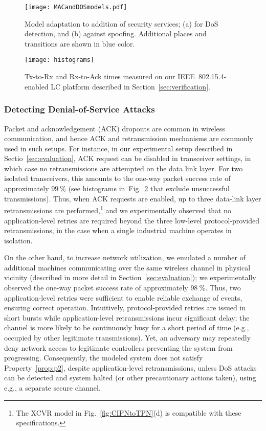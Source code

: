 \begin{figure}[!t]
	\centering
	\texttt{[image: MACandDOSmodels.pdf]}
	\caption{Model adaptation to addition of security services; (a) for DoS detection, and (b) against spoofing. Additional places and transitions are shown in blue color.}
	\label{fig:MACandDOSmodels}
\end{figure}
%
\begin{figure}[!t]
	\centering
	\texttt{[image: histograms]}
	\caption{Tx-to-Rx and Rx-to-Ack times measured on our IEEE~802.15.4-enabled LC platform described in Section~\ref{sec:verification}.}
	\label{fig:histograms}
\end{figure}
%


\subsubsection{Detecting Denial-of-Service Attacks}
\label{subsubsec:DoSdetection}
Packet and acknowledgement (ACK) dropouts are common in wireless communication, and hence ACK and retransmission mechanisms are commonly used in such setups. For instance, in our experimental setup described in Sectio~\ref{sec:evaluation}, ACK request can be disabled in transceiver settings, in which case no retransmissions are attempted on the data link layer. For two isolated transceivers, this amounts to the one-way packet success rate of approximately $99~\%$ (see histograms in~Fig.~\ref{fig:histograms} that exclude unsuccessful transmissions). Thus, when ACK requests are enabled, up to three data-link layer retransmissions are performed,\footnote{The XCVR model in Fig.~\ref{fig:CIPNtoTPN}(d) is compatible with these specifications.} and we experimentally observed that no application-level retries are required beyond the three low-level protocol-provided retransmissions, in the case when a single industrial machine operates in isolation.

On the other hand, to increase network utilization, we emulated a number of additional machines communicating over the same wireless channel in physical vicinity (described in more detail in Section~\ref{sec:evaluation}); we experimentally observed the one-way packet success rate of approximately $98~\%$. Thus, two application-level retries were sufficient to enable reliable exchange of events, ensuring correct operation. Intuitively, protocol-provided retries are issued in short bursts while application-level retransmissions incur significant delay; the channel is more likely to be continuously busy for a short period of time (e.g., occupied by other legitimate transmissions). Yet, an adversary may repeatedly deny network access to legitimate controllers preventing the system from progressing. {Consequently, the modeled system does not satisfy Property~\ref{prop:p2}, despite application-level retransmissions, unless DoS attacks can be detected and system halted (or other precautionary actions taken), using e.g., a separate secure channel.}

